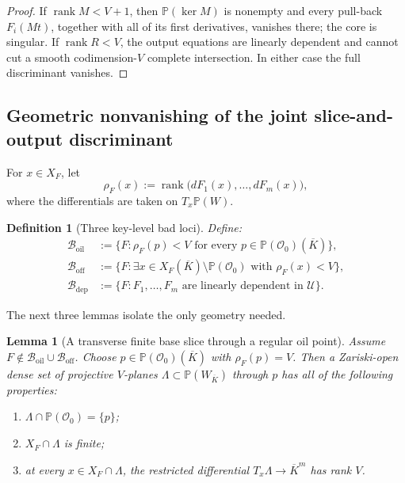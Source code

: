 \documentclass[10pt,a4paper]{article}
\newtheorem{lemma}[theorem]{Lemma}
\newtheorem{definition}[theorem]{Definition}
\newcommand{\PP}{\mathbb P}
\newcommand{\cO}{\mathcal O}
\newcommand{\cB}{\mathcal B}
\newcommand{\cU}{\mathcal U}
\newcommand{\rank}{\operatorname{rank}}
\newcommand{\oil}{\mathrm{oil}}
\newcommand{\off}{\mathrm{off}}
\newcommand{\dep}{\mathrm{dep}}
\begin{document}
\begin{proof}
If $\rank M<V+1$, then $\PP(\ker M)$ is nonempty and every pull-back $F_i(Mt)$, together with all of its first derivatives, vanishes there; the core is singular.  If $\rank R<V$, the output equations are linearly dependent and cannot cut a smooth codimension-$V$ complete intersection.  In either case the full discriminant vanishes.
\end{proof}

\subsection{Geometric nonvanishing of the joint slice-and-output discriminant}

For $x\in X_F$, let
\[
\rho_F(x):=\rank\bigl(dF_1(x),\ldots,dF_m(x)\bigr),
\]
where the differentials are taken on $T_x\PP(W)$.

\begin{definition}[Three key-level bad loci]\label{def:bad-loci}
Define:
\begin{align*}
\cB_{\oil}&:=\{F:\rho_F(p)<V\text{ for every }p\in\PP(\cO_0)(\overline K)\},\\
\cB_{\off}&:=\{F:\exists x\in X_F(\overline K)\setminus\PP(\cO_0)\text{ with }\rho_F(x)<V\},\\
\cB_{\dep}&:=\{F:F_1,\ldots,F_m\text{ are linearly dependent in }\cU\}.
\end{align*}
\end{definition}

The next three lemmas isolate the only geometry needed.

\begin{lemma}[A transverse finite base slice through a regular oil point]\label{lem:linear-section}
Assume $F\notin\cB_{\oil}\cup\cB_{\off}$.  Choose
$p\in\PP(\cO_0)(\overline K)$ with $\rho_F(p)=V$.  Then a Zariski-open dense set of projective $V$-planes $\Lambda\subset\PP(W_{\overline K})$ through $p$ has all of the following properties:
\begin{enumerate}
\item $\Lambda\cap\PP(\cO_0)=\{p\}$;
\item $X_F\cap\Lambda$ is finite;
\item at every $x\in X_F\cap\Lambda$, the restricted differential $T_x\Lambda\to\overline K^m$ has rank $V$.
\end{enumerate}
\end{lemma}
\end{document}
